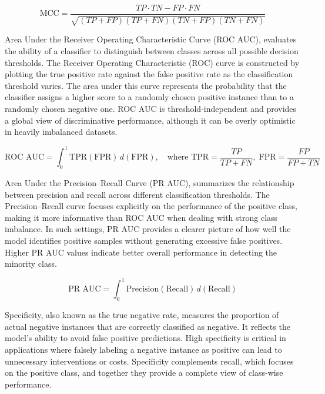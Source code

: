 \documentclass[en]{dimscthesis}
\begin{document}
\begin{equation}
	\text{MCC}
	= \frac{TP \cdot TN - FP \cdot FN}
	{\sqrt{(TP + FP)(TP + FN)(TN + FP)(TN + FN)}}
\end{equation}

Area Under the Receiver Operating Characteristic Curve (ROC AUC), evaluates the ability of a classifier to distinguish between classes across all possible decision thresholds. The Receiver Operating Characteristic (ROC) curve is constructed by plotting the true positive rate against the false positive rate as the classification threshold varies. The area under this curve represents the probability that the classifier assigns a higher score to a randomly chosen positive instance than to a randomly chosen negative one. ROC AUC is threshold-independent and provides a global view of discriminative performance, although it can be overly optimistic in heavily imbalanced datasets. 

\begin{equation}
	\text{ROC AUC}
	= \int_{0}^{1} \text{TPR}(\text{FPR}) \, d(\text{FPR}),
	\quad
	\text{where }
	\text{TPR} = \frac{TP}{TP + FN},
	\;
	\text{FPR} = \frac{FP}{FP + TN}
\end{equation}

Area Under the Precision–Recall Curve (PR AUC), summarizes the relationship between precision and recall across different classification thresholds. The Precision–Recall curve focuses explicitly on the performance of the positive class, making it more informative than ROC AUC when dealing with strong class imbalance. In such settings, PR AUC provides a clearer picture of how well the model identifies positive samples without generating excessive false positives. Higher PR AUC values indicate better overall performance in detecting the minority class. 

\begin{equation}
	\text{PR AUC}
	= \int_{0}^{1} \text{Precision}(\text{Recall}) \, d(\text{Recall})
\end{equation}

Specificity, also known as the true negative rate, measures the proportion of actual negative instances that are correctly classified as negative. It reflects the model’s ability to avoid false positive predictions. High specificity is critical in applications where falsely labeling a negative instance as positive can lead to unnecessary interventions or costs. Specificity complements recall, which focuses on the positive class, and together they provide a complete view of class-wise performance. 
\end{document}
